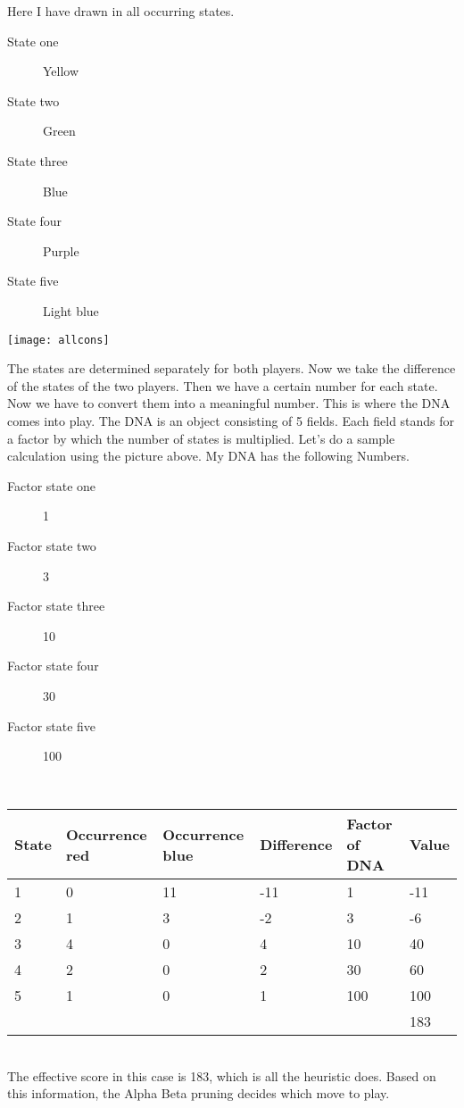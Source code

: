 Here I have drawn in all occurring states.
\begin{description}
\item[State one] Yellow
\item[State two] Green
\item[State three] Blue
\item[State four] Purple
\item[State five] Light blue
\end{description}
\begin{fixedpic}
	\centering
	\texttt{[image: allcons]}
\end{fixedpic}
The states are determined separately for both players. Now we take the difference of the states of the two players. Then we have a certain number for each state. Now we have to convert them into a meaningful number. This is where the DNA comes into play. The DNA is an object consisting of 5 fields. Each field stands for a factor by which the number of states is multiplied.
Let's do a sample calculation using the picture above. My DNA has the following Numbers.
\begin{description}
\item[Factor state one] 1
\item[Factor state two] 3
\item[Factor state three] 10
\item[Factor state four] 30
\item[Factor state five] 100
\end{description}\\
\begin{tabularx}{\textwidth}{|X|X|X|X|X|X|}
\hline
State & Occurrence red & Occurrence blue & Difference & Factor of DNA & Value \\\hline
1	& 0	& 11	& -11	& 1 	& -11 \\\hline
2	& 1	& 3 	& -2	& 3 	& -6 \\\hline
3	& 4	& 0 	& 4 	& 10	& 40 \\\hline
4	& 2	& 0 	& 2 	& 30	& 60 \\\hline
5	& 1	& 0 	& 1 	& 100	& 100 \\\hline
\multicolumn{5}{X|}{} & 183 \\\cline{6-6}
\end{tabularx}\\
The effective score in this case is 183, which is all the heuristic does. Based on this information, the Alpha Beta pruning decides which move to play.



